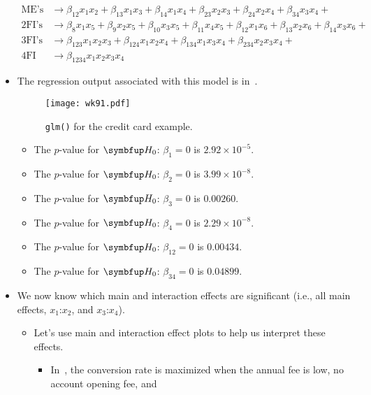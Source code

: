 \begin{itemize}
\begin{align*}
              \text{ME's}      & \to\beta_{12}x_1x_2+\beta_{13}x_1x_3+\beta_{14}x_1x_4+\beta_{23}x_2x_3+\beta_{24}x_2x_4+\beta_{34}x_3x_4+              \\
              \text{2FI's}     & \to\beta_{8}x_1x_5+\beta_9x_2x_5+\beta_{10}x_3x_5+\beta_{11}x_4x_5+\beta_{12}x_1x_6+\beta_{13}x_2x_6+\beta_{14}x_3x_6+ \\
              \text{3FI's}     & \to\beta_{123}x_1x_2x_3+\beta_{124}x_1x_2x_4+\beta_{134}x_1x_3x_4+\beta_{234}x_2x_3x_4+                                \\
              \text{4FI}       & \to\beta_{1234}x_1x_2x_3x_4
          \end{align*}
    \item The regression output associated with this model is in~.
          \begin{figure}[!htbp]
              \centering
              \texttt{[image: wk91.pdf]}
              \caption{\texttt{glm()} for the credit card example.}\label{fig:creditcardglm}
          \end{figure}
          \begin{itemize}
              \item The $ p $-value for $ \HN $: $ \beta_1=0 $ is $ 2.92\times 10^{-5} $.
              \item The $ p $-value for $ \HN $: $ \beta_2=0 $ is $ 3.99\times 10^{-8} $.
              \item The $ p $-value for $ \HN $: $ \beta_3=0 $ is $ 0.00260 $.
              \item The $ p $-value for $ \HN $: $ \beta_4=0 $ is $ 2.29\times 10^{-8} $.
              \item The $ p $-value for $ \HN $: $ \beta_{12}=0 $ is $ 0.00434 $.
              \item The $ p $-value for $ \HN $: $ \beta_{34}=0 $ is $ 0.04899 $.
          \end{itemize}
    \item We now know which main and interaction effects are significant (i.e., all main effects, $ x_1 $:$ x_2 $, and $ x_3 $:$ x_4 $).
          \begin{itemize}
              \item Let's use main and interaction effect plots to help us interpret these effects.
                    \begin{itemize}
                        \item In~, the conversion rate is maximized when the annual fee is low, no account opening fee, and

\end{itemize}
\end{itemize}
\end{itemize}

